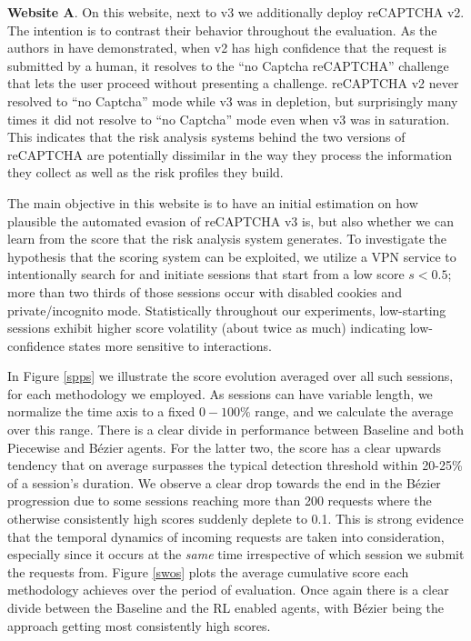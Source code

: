 \textbf{Website A}. On this website, next to v3 we additionally deploy reCAPTCHA v2.
The intention is to contrast their behavior throughout the evaluation.
As the authors in \cite{sivakorn2016robot} have demonstrated, when v2 has high confidence that the request is submitted by a human, it resolves to the ``no Captcha reCAPTCHA'' challenge that lets the user proceed without presenting a challenge.
reCAPTCHA v2 never resolved to ``no Captcha'' mode while v3 was in depletion, but surprisingly many times it did not resolve to ``no Captcha'' mode even when v3 was in saturation.
This indicates that the risk analysis systems behind the two versions of reCAPTCHA are potentially dissimilar in the way they process the information they collect as well as the risk profiles they build.

The main objective in this website is to have an initial estimation on how plausible the automated evasion of reCAPTCHA v3 is, but also whether we can learn from the score that the risk analysis system generates.
To investigate the hypothesis that the scoring system can be exploited, we utilize a \gls{VPN} service to intentionally search for and initiate sessions that start from a low score $s < 0.5$; more than two thirds of those sessions occur with disabled cookies and private/incognito mode.
Statistically throughout our experiments, low-starting sessions exhibit higher score volatility (about twice as much) indicating low-confidence states more sensitive to interactions.

In Figure \ref{spps} we illustrate the score evolution averaged over all such sessions, for each methodology we employed.
As sessions can have variable length, we normalize the time axis to a fixed $0-100\%$ range, and we calculate the average over this range.
There is a clear divide in performance between Baseline and both Piecewise and Bézier agents.
For the latter two, the score has a clear upwards tendency that on average surpasses the typical detection threshold within 20-25\% of a session's duration.
We observe a clear drop towards the end in the Bézier progression due to some sessions reaching more than 200 requests where the otherwise consistently high scores suddenly deplete to 0.1.
This is strong evidence that the temporal dynamics of incoming requests are taken into consideration, especially since it occurs at the \emph{same} time irrespective of which session we submit the requests from.
Figure \ref{swos} plots the average cumulative score each methodology achieves over the period of evaluation.
Once again there is a clear divide between the Baseline and the \gls{RL} enabled agents, with Bézier being the approach getting most consistently high scores.

